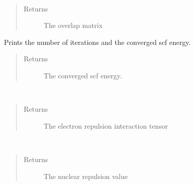 \documentclass[letterpaper,10pt,english]{sphinxmanual}
\begin{document}
\begin{fulllineitems}
\begin{fulllineitems}
\label{\detokenize{RHF:ghf.RHF.RHF.get_ovlp}}~\begin{quote}\begin{description}
\item[{Returns}] \leavevmode
The overlap matrix

\end{description}\end{quote}

\end{fulllineitems}


\begin{fulllineitems}
\label{\detokenize{RHF:ghf.RHF.RHF.get_scf_solution}}
Prints the number of iterations and the converged scf energy.
\begin{quote}\begin{description}
\item[{Returns}] \leavevmode
The converged scf energy.

\end{description}\end{quote}

\end{fulllineitems}


\begin{fulllineitems}
\label{\detokenize{RHF:ghf.RHF.RHF.get_two_e}}~\begin{quote}\begin{description}
\item[{Returns}] \leavevmode
The electron repulsion interaction tensor

\end{description}\end{quote}

\end{fulllineitems}


\begin{fulllineitems}
\label{\detokenize{RHF:ghf.RHF.RHF.nuc_rep}}~\begin{quote}\begin{description}
\item[{Returns}] \leavevmode
The nuclear repulsion value


\end{description}
\end{quote}
\end{fulllineitems}
\end{fulllineitems}
\end{document}
